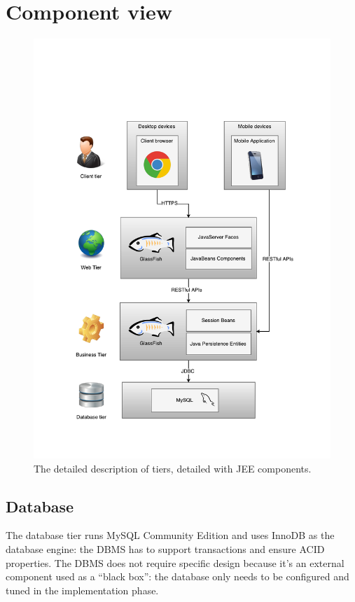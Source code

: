 \section{Component view}
\label{sec:component-view}

\begin{figure}
\centering
\includegraphics[width=\textwidth]{diagrams/JEE_Tiers}
\caption{The detailed description of tiers, detailed with JEE components.}
\label{fig:tiers-jee}
\end{figure}

\subsection{Database}
The database tier runs MySQL Community Edition and uses InnoDB as the database engine: the DBMS has to support transactions and ensure ACID properties.
The DBMS does not require specific design because it's an external component used as a ``black box'': the database only needs to be configured and tuned in the implementation phase.

